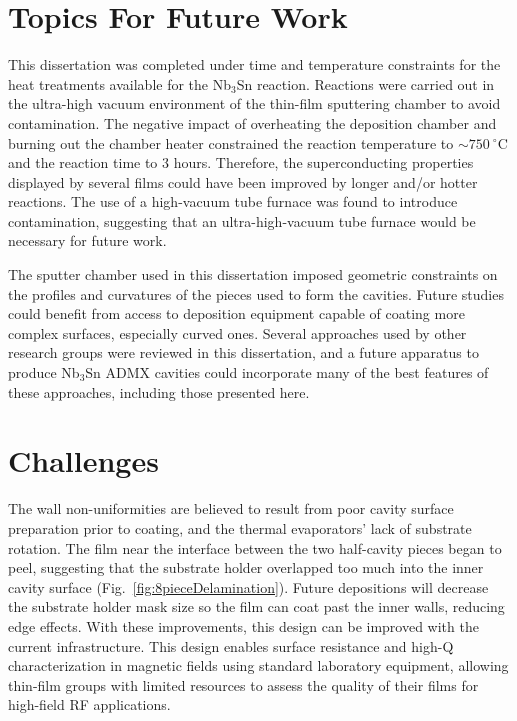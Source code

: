 \section{Topics For Future Work}

This dissertation was completed under time and temperature constraints for the heat treatments available for the Nb$_3$Sn reaction. Reactions were carried out in the ultra-high vacuum environment of the thin-film sputtering chamber to avoid contamination. The negative impact of overheating the deposition chamber and burning out the chamber heater constrained the reaction temperature to $\sim750~^\circ$C and the reaction time to 3 hours. Therefore, the superconducting properties displayed by several films could have been improved by longer and/or hotter reactions. The use of a high-vacuum tube furnace was found to introduce contamination, suggesting that an ultra-high-vacuum tube furnace would be necessary for future work.

The sputter chamber used in this dissertation imposed geometric constraints on the profiles and curvatures of the pieces used to form the cavities. Future studies could benefit from access to deposition equipment capable of coating more complex surfaces, especially curved ones. Several approaches used by other research groups were reviewed in this dissertation, and a future apparatus to produce Nb$_3$Sn ADMX cavities could incorporate many of the best features of these approaches, including those presented here.



\section{Challenges}

The wall non-uniformities are believed to result from poor cavity surface preparation prior to coating, and the thermal evaporators' lack of substrate rotation. The film near the interface between the two half-cavity pieces began to peel, suggesting that the substrate holder overlapped too much into the inner cavity surface (Fig.~\ref{fig:8pieceDelamination}). Future depositions will decrease the substrate holder mask size so the film can coat past the inner walls, reducing edge effects. With these improvements, this design can be improved with the current infrastructure. This design enables surface resistance and high-Q characterization in magnetic fields using standard laboratory equipment, allowing thin-film groups with limited resources to assess the quality of their films for high-field RF applications.